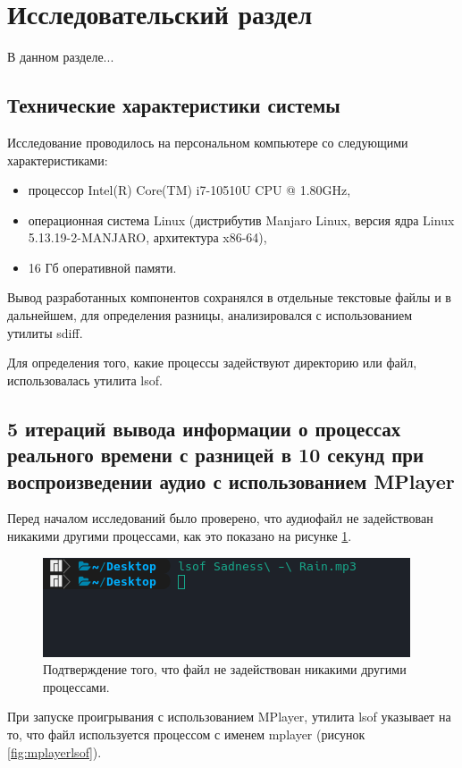 \section{Исследовательский раздел} 
В данном разделе...

\subsection{Технические характеристики системы}
Исследование проводилось на персональном компьютере со следующими характеристиками:

\begin{itemize}
\item процессор Intel(R) Core(TM) i7-10510U CPU @ 1.80GHz,
\item операционная система Linux (дистрибутив Manjaro Linux, версия ядра Linux 5.13.19-2-MANJARO, архитектура x86-64),
\item 16 Гб оперативной памяти.
\end{itemize}

Вывод разработанных компонентов сохранялся в отдельные текстовые файлы и в дальнейшем, для определения разницы, анализировался с использованием утилиты sdiff.

Для определения того, какие процессы задействуют директорию или файл, использовалась утилита lsof.

\subsection{5 итераций вывода информации о процессах реального времени с разницей в 10 секунд при воспроизведении аудио с использованием MPlayer}
Перед началом исследований было проверено, что аудиофайл не задействован никакими другими процессами, как это показано на рисунке \ref{fig:emptylsof}.

\begin{figure}[H]
	\centering
	\includegraphics[scale=1]{img/emptylsof.png}
	\caption{Подтверждение того, что файл не задействован никакими другими процессами.}
	\label{fig:emptylsof}
\end{figure}

При запуске проигрывания с использованием MPlayer, утилита lsof указывает на то, что файл используется процессом с именем mplayer (рисунок \ref{fig:mplayerlsof}).

